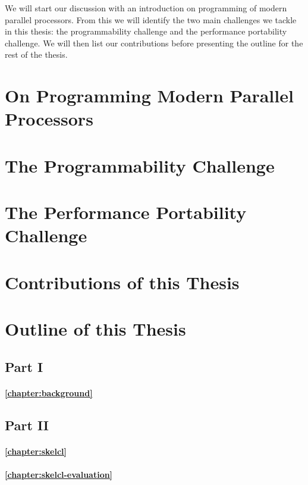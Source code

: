We will start our discussion with an introduction on programming of modern parallel processors.
From this we will identify the two main challenges we tackle in this thesis:
the programmability challenge and the performance portability challenge.
We will then list our contributions before presenting the outline for the rest of the thesis.

\section{On Programming Modern Parallel Processors}

\section{The Programmability Challenge}

\section{The Performance Portability Challenge}

\section{Contributions of this Thesis}

\section{Outline of this Thesis}

\subsection*{Part I}

\paragraph{\autoref{chapter:background}}

\subsection*{Part II}

\paragraph{\autoref{chapter:skelcl}}

\paragraph{\autoref{chapter:skelcl-evaluation}}

